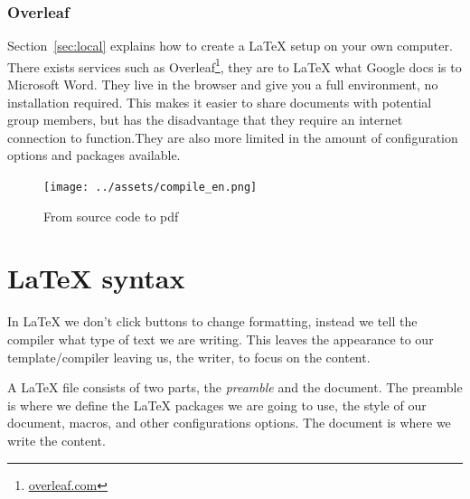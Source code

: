 \documentclass{article}
\begin{document}
\subsubsection{Overleaf}
Section~\ref{sec:local} explains how to create a \LaTeX{} setup on your own
computer. There exists services such as Overleaf\footnote{\url{overleaf.com}},
they are to \LaTeX{} what Google docs is to Microsoft Word. They live in the
browser and give you a full environment, no installation required. This makes
it easier to share documents with potential group members, but has the
disadvantage that they require an internet connection to function.They are
also more limited in the amount of configuration options and packages available.

\begin{figure}[h]
	\centering
	\texttt{[image: ../assets/compile\_en.png]}
	\caption{From source code to pdf}\label{fig:compile}
\end{figure}


\section{\LaTeX{} syntax}
In \LaTeX{} we don't click buttons to change formatting, instead we tell the
compiler what type of text we are writing. This leaves the appearance to our
template/compiler leaving us, the writer, to focus on the content.

A \LaTeX{} file consists of two parts, the \emph{preamble} and the document.
The preamble is where we define the \LaTeX{} packages we are going to use,
the style of our document, macros, and other configurations options.
The document is where we write the content.
\end{document}
